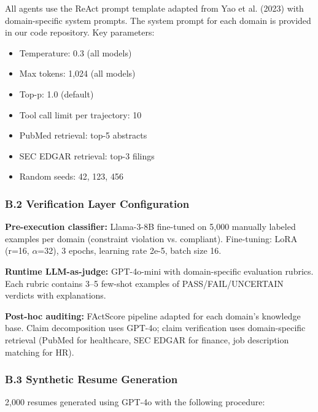 \documentclass[
]{article}
\providecommand{\tightlist}{%
  \setlength{\itemsep}{0pt}\setlength{\parskip}{0pt}}
\begin{document}
All agents use the ReAct prompt template adapted from Yao et al. (2023) with domain-specific system prompts. The system prompt for each domain is provided in our code repository. Key parameters:

\begin{itemize}
\tightlist
\item
  Temperature: 0.3 (all models)
\item
  Max tokens: 1,024 (all models)
\item
  Top-p: 1.0 (default)
\item
  Tool call limit per trajectory: 10
\item
  PubMed retrieval: top-5 abstracts
\item
  SEC EDGAR retrieval: top-3 filings
\item
  Random seeds: 42, 123, 456
\end{itemize}

\hypertarget{b2-verification-layer-configuration}{%
\subsubsection{B.2 Verification Layer Configuration}\label{b2-verification-layer-configuration}}

\textbf{Pre-execution classifier:} Llama-3-8B fine-tuned on 5,000 manually labeled examples per domain (constraint violation vs. compliant). Fine-tuning: LoRA (r=16, $\alpha$=32), 3 epochs, learning rate 2e-5, batch size 16.

\textbf{Runtime LLM-as-judge:} GPT-4o-mini with domain-specific evaluation rubrics. Each rubric contains 3--5 few-shot examples of PASS/FAIL/UNCERTAIN verdicts with explanations.

\textbf{Post-hoc auditing:} FActScore pipeline adapted for each domain's knowledge base. Claim decomposition uses GPT-4o; claim verification uses domain-specific retrieval (PubMed for healthcare, SEC EDGAR for finance, job description matching for HR).

\hypertarget{b3-synthetic-resume-generation}{%
\subsubsection{B.3 Synthetic Resume Generation}\label{b3-synthetic-resume-generation}}

2,000 resumes generated using GPT-4o with the following procedure:
\end{document}
